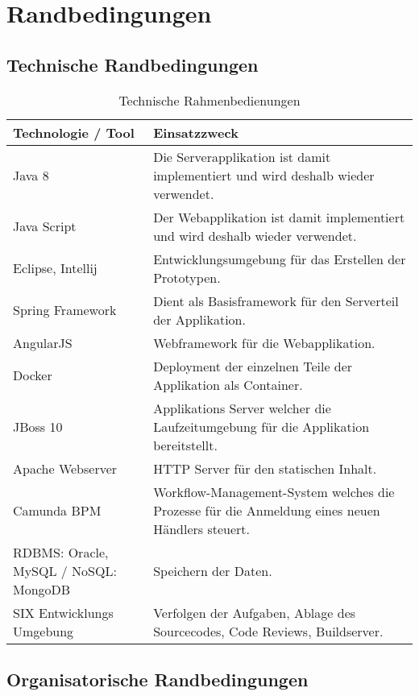 \chapter{Randbedingungen}

\section{Technische Randbedingungen}

\begin{table}[H]
	\centering
	\caption{Technische Rahmenbedienungen}
	\begin{tabular}{ | p{4cm} | p{12cm} | }
		\toprule
		{\textbf{Technologie / Tool}} & {\textbf{Einsatzzweck}} \\
		\midrule
		Java 8 & Die Serverapplikation ist damit implementiert und wird deshalb wieder verwendet. \\ \hline
		Java Script & Der Webapplikation ist damit implementiert und wird deshalb wieder verwendet. \\ \hline
		Eclipse, Intellij & Entwicklungsumgebung für das Erstellen der Prototypen. \\ \hline
		Spring Framework & Dient als Basisframework für den Serverteil der Applikation.  \\ \hline
		AngularJS & Webframework für die Webapplikation. \\ \hline
		Docker & Deployment der einzelnen Teile der Applikation als Container. \\ \hline
		JBoss 10 & Applikations Server welcher die Laufzeitumgebung für die Applikation bereitstellt. \\ \hline
		Apache Webserver & HTTP Server für den statischen Inhalt. \\ \hline
		Camunda BPM & Workflow-Management-System welches die Prozesse für die Anmeldung eines neuen Händlers steuert. \\ \hline
		RDBMS: Oracle, MySQL / NoSQL: MongoDB & Speichern der Daten. \\ \hline
		SIX Entwicklungs Umgebung  & Verfolgen der Aufgaben, Ablage des Sourcecodes, Code Reviews, Buildserver.\\
		\bottomrule
	\end{tabular}
\end{table}

\section{Organisatorische Randbedingungen}

